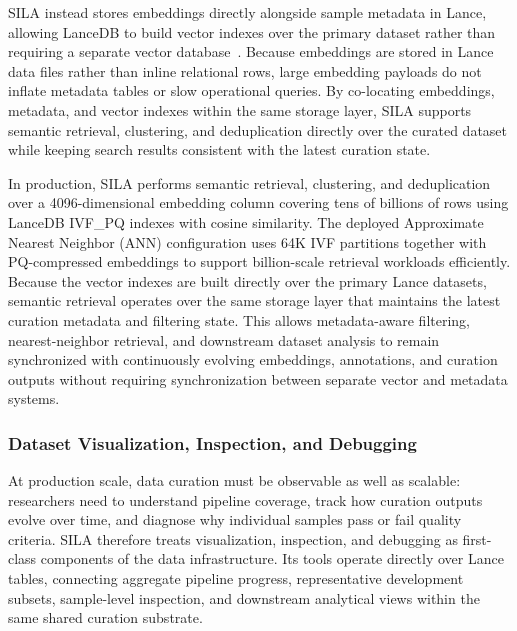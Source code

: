 \documentclass{llmxive}
\begin{document}
SILA instead stores embeddings directly alongside sample metadata in Lance, allowing LanceDB to build vector indexes over the primary dataset rather than requiring a separate vector database~\citep{lancedb2026vectorindexes}. Because embeddings are stored in Lance data files rather than inline relational rows, large embedding payloads do not inflate metadata tables or slow operational queries. By co-locating embeddings, metadata, and vector indexes within the same storage layer, SILA supports semantic retrieval, clustering, and deduplication directly over the curated dataset while keeping search results consistent with the latest curation state.

In production, SILA performs semantic retrieval, clustering, and deduplication over a 4096-dimensional embedding column covering tens of billions of rows using LanceDB IVF\_PQ indexes with cosine similarity. The deployed Approximate Nearest Neighbor (ANN) configuration uses 64K IVF partitions together with PQ-compressed embeddings to support billion-scale retrieval workloads efficiently. Because the vector indexes are built directly over the primary Lance datasets, semantic retrieval operates over the same storage layer that maintains the latest curation metadata and filtering state. This allows metadata-aware filtering, nearest-neighbor retrieval, and downstream dataset analysis to remain synchronized with continuously evolving embeddings, annotations, and curation outputs without requiring synchronization between separate vector and metadata systems.

\subsubsection{Dataset Visualization, Inspection, and Debugging}

At production scale, data curation must be observable as well as scalable: researchers need to understand pipeline coverage, track how curation outputs evolve over time, and diagnose why individual samples pass or fail quality criteria. SILA therefore treats visualization, inspection, and debugging as first-class components of the data infrastructure. Its tools operate directly over Lance tables, connecting aggregate pipeline progress, representative development subsets, sample-level inspection, and downstream analytical views within the same shared curation substrate.
\end{document}

